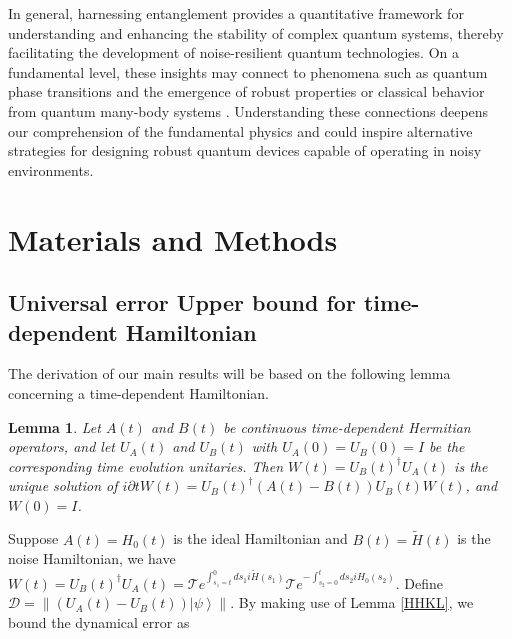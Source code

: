 \documentclass[12pt]{article}
\newtheorem{lemma}{Lemma}
\newcommand{\autoref}[1]{\ref{#1}}
\newcommand{\ket}[1]{\left|#1\right\rangle}
\newcommand{\norm}[1]{\left\lVert #1\right\rVert}
\begin{document}
In general,  harnessing entanglement provides a quantitative framework for understanding and enhancing the stability of complex quantum systems, thereby facilitating the development of noise-resilient quantum technologies. On a fundamental level, these insights may connect to phenomena such as quantum phase transitions \cite{osterloh2002scaling,EntanglementQFTPhysRevA.66.032110,HaiqingLin2004PhysRevLett.93.086402} and the emergence of robust properties or classical behavior from quantum many-body systems \cite{zurek2022emergence}.  Understanding these connections deepens our comprehension of the fundamental physics and could inspire alternative strategies for designing robust quantum devices capable of operating in noisy environments.






 








\section*{Materials and Methods}

\subsection*{Universal error Upper bound for time-dependent Hamiltonian}
The derivation of our main results will be based on the following lemma concerning a time-dependent Hamiltonian.
\begin{lemma}     \label{HHKLsupp}\cite{HHKL8555119}
    Let $A(t)$ and $B(t)$ be continuous time-dependent Hermitian operators, and let $U_A(t)$ and $U_B(t)$  with $U_A(0) = U_B(0) = I$ be the corresponding time evolution unitaries. 
    Then $W(t)=U_B(t)^\dagger U_A(t)$ is the unique solution of $ i \partial t W(t) =U_B (t)^\dagger (A(t)-B(t))U_B(t ) W(t)$, and $W(0)=I$.
\end{lemma}


Suppose $A(t)=H_0(t)$ is the ideal Hamiltonian and $B(t)=\widetilde{H}(t)$ is the noise Hamiltonian, we have $W(t)=U_{B}(t)^\dagger U_A(t)=\mathcal{T}e^{\int_{s_1=t}^{0}ds_1i\widetilde{H}(s_1)} \mathcal{T}e^{-\int_{s_2=0}^{t}d{s_2}iH_0(s_2)}$.  Define $\mathcal{D}=\norm{(U_A(t)-U_B(t))\ket{\psi}}$.
By making use of Lemma \autoref{HHKL}, we bound the dynamical error as
\end{document}
